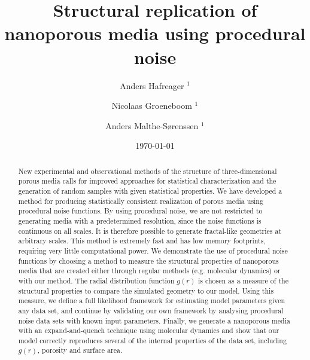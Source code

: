 \documentclass[aps,pre,twocolumn,letterpaper,floatfix,showpacs]{revtex4}
\begin{document}
\title{Structural replication of nanoporous media using procedural noise}
\author{Anders Hafreager $^{1}$} 
\author{Nicolaas Groeneboom $^{1}$} 
\author{Anders Malthe-S\o renssen $^1$}
\date{\today} 

\begin{abstract} 
New experimental and observational methods of the structure of three-dimensional porous media calls for improved approaches for statistical characterization and the generation of random samples with given statistical properties. 
We have developed a method for producing statistically consistent realization of porous media using procedural noise functions. By using procedural noise, we are not restricted to generating media with a predetermined resolution, since the noise functions is continuous on all scales. It is therefore possible to generate fractal-like geometries at arbitrary scales. This method is extremely fast and has low memory footprints, requiring very little computational power. We demonstrate the use of procedural noise functions by choosing a method to measure the structural properties of nanoporous media that are created either through regular methods (e.g. molecular dynamics) or with our method. The radial distribution function $g(r)$ is chosen as a measure of the structural properties to compare the simulated geometry to our model. Using this measure, we define a full likelihood framework for estimating model parameters given any data set, and continue by validating our own framework by analysing procedural noise data sets with known input parameters. Finally, we generate a nanoporous media with an expand-and-quench technique using molecular dynamics and show that our model correctly reproduces several of the internal properties of the data set, including $g(r)$, porosity and surface area. 
\end{abstract} 
 
\maketitle
 
\end{document}
